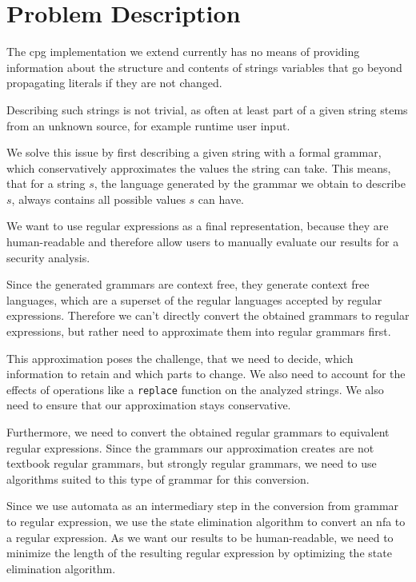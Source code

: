 \chapter{Problem Description}
\label{chapter:ProblemDescription}

The \ac{cpg} implementation we extend currently has no means of providing information about the structure and contents of strings variables that go beyond propagating literals if they are not changed.

Describing such strings is not trivial, as often at least part of a given string stems from an unknown source, for example runtime user input.

We solve this issue by first describing a given string with a formal grammar, which conservatively approximates the values the string can take.
This means, that for a string $s$, the language generated by the grammar we obtain to describe $s$, always contains all possible values $s$ can have.

We want to use regular expressions as a final representation, because they are human-readable and therefore allow users to manually evaluate our results for a security analysis.

Since the generated grammars are context free, they generate context free languages, which are a superset of the regular languages accepted by regular expressions. Therefore we can't directly convert the obtained grammars to regular expressions, but rather need to approximate them into regular grammars first.

This approximation poses the challenge, that we need to decide, which information to retain and which parts to change. We also need to account for the effects of operations like a \lstinline|replace| function on the analyzed strings. We also need to ensure that our approximation stays conservative.

Furthermore, we need to convert the obtained regular grammars to equivalent regular expressions. Since the grammars our approximation creates are not textbook regular grammars, but strongly regular grammars, we need to use algorithms suited to this type of grammar for this conversion.

Since we use automata as an intermediary step in the conversion from grammar to regular expression, we use the state elimination algorithm \cite{brzozowksi_mccluskey} to convert an \ac{nfa} to a regular expression. As we want our results to be human-readable, we need to minimize the length of the resulting regular expression by optimizing the state elimination algorithm.

